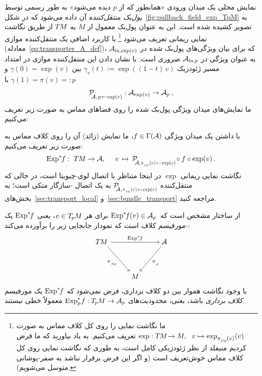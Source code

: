 نمایش محلی یک میدان ورودی «همانطور که از $p$ دیده می‌شود» به طور رسمی توسط \emph{پول‌بک منتقل‌کننده} آن داده می‌شود که در شکل~\ref{fig:pullback_field_exp_TpM} به تصویر کشیده شده است.
این به عنوان پول‌بک معمول از $M$ به $T\mkern-1.5muM$ از طریق نگاشت نمایی ریمانی تعریف می‌شود%
\footnote{
    ما نگاشت نمایی را روی کل کلاف مماس به صورت
    $\exp: \TM \!\to M,\ \ v \mapsto \exp_{\scalebox{.85}{$\pi_{\overset{}{\protect\scalebox{.6}{$T\mkern-2muM$}}}\mkern-1mu(v)$}}(v)$ تعریف می‌کنیم.
    به یاد بیاورید که ما فرض کردیم منیفلد از نظر ژئودزیکی کامل است، به طوری که نگاشت نمایی روی کل کلاف مماس خوش‌تعریف است (و اگر این فرض برقرار نباشد به صفر-پوشانی متوسل می‌شویم).
}
با کاربرد اضافی یک منتقل‌کننده موازی (معادله~\eqref{eq:transporter_A_def})، که برای بیان ویژگی‌های پول‌بک شده در $\mathcal{A}_{\textup{in},\exp(v)}$ به عنوان ویژگی در $\mathcal{A}_{\textup{in},p}$ ضروری است.
با نشان دادن این منتقل‌کننده موازی در امتداد مسیر ژئودزیک $\gamma_v(t) := \exp((1-t) \,v)$ بین $\gamma(0) = \exp(v)$ و $\gamma(1) = \pi(v) =: p$ با
\begin{align}
    \mathcal{P}_{\mkern-4mu\overset{}{\protect\scalebox{.75}{$\!\A$},\protect\scalebox{.75}{$\, p\!\leftarrow\!\exp(v)$}}}
    : \A_{\exp(v)} \to \A_p \,,
\end{align}
ما نمایش‌های میدان ویژگی پول‌بک شده را روی فضاهای مماس به صورت زیر تعریف می‌کنیم:
\begin{dfn}
\label{dfn:Expf_pullback_field}
    با داشتن یک میدان ویژگی $f \in \Gamma(\mathcal{A})$، ما نمایش (زائد) آن را روی کلاف مماس به صورت زیر تعریف می‌کنیم:
    \begin{align}
        \Expsf :\ \TM \to \A, \quad\ 
        v \,\mapsto\, \PAexpv \!\circ f \circ \exp(v) \,.
    \end{align}
    نگاشت نمایی ریمانی $\exp$ در اینجا متناظر با اتصال لوی-چیویتا است، در حالی که منتقل‌کننده $\PAexpv$ به یک اتصال -سازگار متکی است؛ به بخش‌های~\ref{sec:transport_local} و~\ref{sec:bundle_transport} مراجعه کنید.

    از ساختار مشخص است که $\operatorname{Exp}^*\mkern-5mu f(v) \in \mathcal{A}_p\,$ برای هر $v \in T_{\mkern-1.5mu p}\mkern-.5muM$، یعنی $\operatorname{Exp}^*\mkern-5mu f$ یک -مورفیسم کلاف است که نمودار جابجایی زیر را برآورده می‌کند:
    \begin{equation}\label{eq:pullback_field_bundle_map}
        \begin{tikzcd}[row sep=3.5em, column sep=2.5em]
            \TM  \arrow[rd, start anchor={[xshift=.6ex]}, "\piTM"']
                \arrow[rr, "\Expsf"]
            & &
            \mkern-3mu
            \A
                \arrow[ld, "\piA"] \\
            & M &
        \end{tikzcd}
    \end{equation}
    با وجود نگاشت هموار بین دو کلاف برداری، فرض نمی‌شود که $\operatorname{Exp}^*\mkern-5mu f$ یک مورفیسم \emph{کلاف برداری} باشد، یعنی، محدودیت‌های $\operatorname{Exp}^*_p\mkern-2mu f: T_{\mkern-1.5mu p}\mkern-.5muM \to \mathcal{A}_p$ معمولاً خطی نیستند.
\end{dfn}
